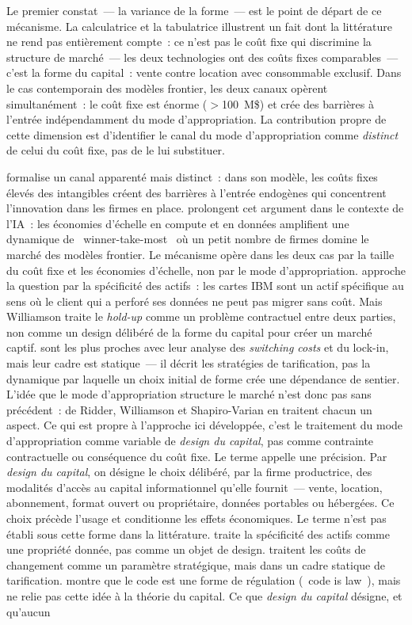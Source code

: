 \markINST
Le premier constat~--- la variance de la forme~--- est le point de départ de ce mécanisme. La calculatrice et la tabulatrice illustrent un fait dont la littérature ne rend pas entièrement compte~: ce n'est pas le coût fixe qui discrimine la structure de marché~--- les deux technologies ont des coûts fixes comparables~--- c'est la forme du capital~: vente contre location avec consommable exclusif. Dans le cas contemporain des modèles frontier, les deux canaux opèrent simultanément~: le coût fixe est énorme ($>$100~M\$) et crée des barrières à l'entrée indépendamment du mode d'appropriation. La contribution propre de cette dimension est d'identifier le canal du mode d'appropriation comme \emph{distinct} de celui du coût fixe, pas de le lui substituer.

\textcite{de_ridder_2024} formalise un canal apparenté mais distinct~: dans son modèle, les coûts fixes élevés des intangibles créent des barrières à l'entrée endogènes qui concentrent l'innovation dans les firmes en place. \textcite{athey_ai_competition_2025} prolongent cet argument dans le contexte de l'IA~: les économies d'échelle en compute et en données amplifient une dynamique de \og~winner-take-most~\fg{} où un petit nombre de firmes domine le marché des modèles frontier. Le mécanisme opère dans les deux cas par la taille du coût fixe et les économies d'échelle, non par le mode d'appropriation. \textcite{williamson_economic_1985} approche la question par la spécificité des actifs~: les cartes IBM sont un actif spécifique au sens où le client qui a perforé ses données ne peut pas migrer sans coût. Mais Williamson traite le \emph{hold-up} comme un problème contractuel entre deux parties, non comme un design délibéré de la forme du capital pour créer un marché captif. \textcite{shapiro_varian_1999} sont les plus proches avec leur analyse des \emph{switching costs} et du lock-in, mais leur cadre est statique~--- il décrit les stratégies de tarification, pas la dynamique par laquelle un choix initial de forme crée une dépendance de sentier. L'idée que le mode d'appropriation structure le marché n'est donc pas sans précédent~: de Ridder, Williamson et Shapiro-Varian en traitent chacun un aspect. Ce qui est propre à l'approche ici développée, c'est le traitement du mode d'appropriation comme variable de \emph{design du capital}, pas comme contrainte contractuelle ou conséquence du coût fixe. Le terme appelle une précision. Par \emph{design du capital}, on désigne le choix délibéré, par la firme productrice, des modalités d'accès au capital informationnel qu'elle fournit~--- vente, location, abonnement, format ouvert ou propriétaire, données portables ou hébergées. Ce choix précède l'usage et conditionne les effets économiques. Le terme n'est pas établi sous cette forme dans la littérature. \textcite{williamson_economic_1985} traite la spécificité des actifs comme une propriété donnée, pas comme un objet de design. \textcite{shapiro_varian_1999} traitent les coûts de changement comme un paramètre stratégique, mais dans un cadre statique de tarification. \textcite{lessig_code_1999} montre que le code est une forme de régulation (\og~code is law~\fg{}), mais ne relie pas cette idée à la théorie du capital. Ce que \emph{design du capital} désigne, et qu'aucun 